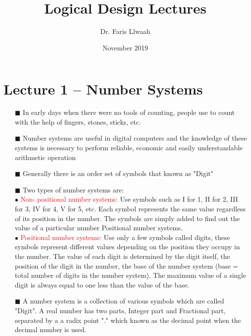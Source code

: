 \documentclass{article}
\title{Logical Design Lectures}
\author{Dr. Faris Llwaah}
\date{November 2019}
\begin{document}
\maketitle

\section { \huge {Lecture 1    -- Number Systems}}
\begin{itemize}

  \item[$\blacksquare$]  In early days when there were no tools of counting, people use to count with the help of fingers, stones, sticks, etc.
  \item[$\blacksquare$] Number systems are useful in digital computers and the knowledge of these systems is necessary to perform reliable, economic and easily understandable arithmetic operation
  \item[$\blacksquare$]  Generally there is an order set of symbols that known as "Digit"
  \item[$\blacksquare$] Two types of number systems are:
  \\
  \hspace {0.5cm} $\bullet$  \textcolor{red} {Non- positional number systems: }Use symbols such as I for 1, II for 2, III for 3, IV for 4, V        
       for 5, etc.  Each symbol represents the same value regardless of its position in the number.
       The symbols are simply added to find out the value of a particular number Positional    
        number systems.
   \\
   \hspace {0.5cm} $\bullet$  \textcolor{red} {Positional number systems: } Use only a few symbols called digits,  these symbols represent         
       different values depending on the position they occupy in the number. The value of each        
       digit is determined by the digit itself,  the position of the digit in the number, the base of the 
       number system  (base = total number of digits in the number system).  The maximum value 
       of a single digit is  always equal to one less than the value of the base.

\item[$\blacksquare$]  A number system is a collection of various symbols which are called "Digit". A real number has two parts, Integer part and Fractional part, separated by a a radix point "." which known as the decimal point when the decimal number is used.
\\


\end{itemize}
\end{document}
